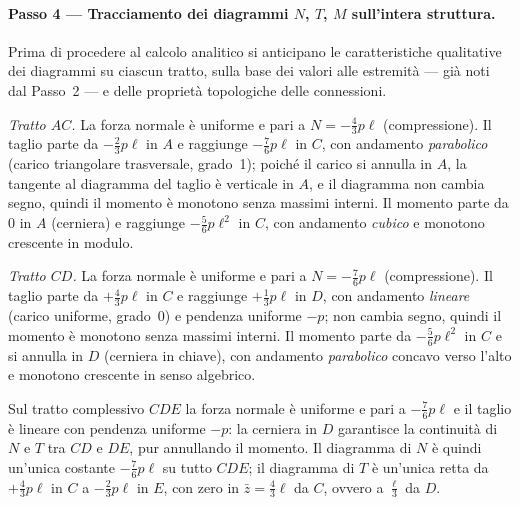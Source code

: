\paragraph{Passo 4 --- Tracciamento dei diagrammi
	$N$, $T$, $M$ sull'intera struttura.}

Prima di procedere al calcolo analitico si anticipano
le caratteristiche qualitative dei diagrammi su ciascun
tratto, sulla base dei valori alle estremità --- già noti
dal Passo~2 --- e delle proprietà topologiche delle
connessioni.

\medskip
\noindent\textit{Tratto $AC$.}
La forza normale è uniforme e pari a
$N = -\tfrac{4}{3}p\ell$ (compressione).
Il taglio parte da $-\tfrac{2}{3}p\ell$ in $A$
e raggiunge $-\tfrac{7}{6}p\ell$ in $C$,
con andamento \emph{parabolico} (carico triangolare
trasversale, grado~1); poiché il carico si annulla
in $A$, la tangente al diagramma del taglio è
verticale in $A$, e il diagramma non cambia segno,
quindi il momento è monotono senza massimi interni.
Il momento parte da $0$ in $A$ (cerniera) e raggiunge
$-\tfrac{5}{6}p\ell^2$ in $C$,
con andamento \emph{cubico} e monotono crescente
in modulo.

\medskip
\noindent\textit{Tratto $CD$.}
La forza normale è uniforme e pari a
$N = -\tfrac{7}{6}p\ell$ (compressione).
Il taglio parte da $+\tfrac{4}{3}p\ell$ in $C$
e raggiunge $+\tfrac{1}{3}p\ell$ in $D$,
con andamento \emph{lineare} (carico uniforme, grado~0)
e pendenza uniforme $-p$; non cambia segno,
quindi il momento è monotono senza massimi interni.
Il momento parte da $-\tfrac{5}{6}p\ell^2$ in $C$
e si annulla in $D$ (cerniera in chiave),
con andamento \emph{parabolico} concavo verso l'alto
e monotono crescente in senso algebrico.

\begin{oss}
	Sul tratto complessivo $CDE$ la forza normale
	è uniforme e pari a $-\tfrac{7}{6}p\ell$
	e il taglio è lineare con pendenza uniforme $-p$:
	la cerniera in $D$ garantisce la continuità
	di $N$ e $T$ tra $CD$ e $DE$, pur annullando
	il momento. Il diagramma di $N$ è quindi
	un'unica costante $-\tfrac{7}{6}p\ell$ su tutto
	$CDE$; il diagramma di $T$ è un'unica retta
	da $+\tfrac{4}{3}p\ell$ in $C$
	a $-\tfrac{2}{3}p\ell$ in $E$, con zero in
	$\bar{z} = \tfrac{4}{3}\ell$ da $C$, ovvero a
	$\tfrac{\ell}{3}$ da $D$.
\end{oss}

